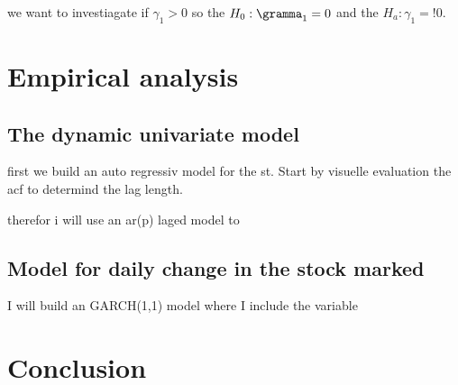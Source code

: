 \documentclass[12pt]{article}
\begin{document}
{we want to investiagate if $\gamma_1 > 0$ so the $H_0: \gramma_1 = 0 $ and the $H_a : \gamma_1 =! 0$.




\newpage






\section{Empirical analysis}




\subsection{The dynamic univariate model}

first we build an auto regressiv model for the st. Start by visuelle evaluation the acf to determind the lag length.




\newpage

therefor i will use an ar(p) laged model to 

\subsection{Model for daily change in the stock marked}

I will build an GARCH(1,1) model where I include the variable






\section{Conclusion}

}
\end{document}
